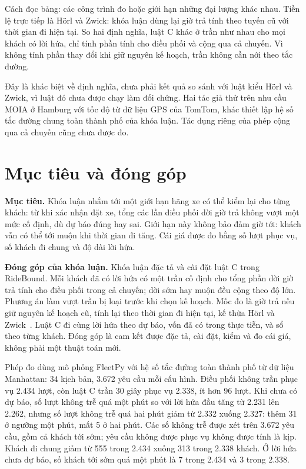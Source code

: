 Cách đọc bảng: các công trình đo hoặc giới hạn những đại lượng khác nhau. Tiền lệ trực tiếp là Hörl và
Zwick: khóa luận dùng lại giờ trả tính theo tuyến cũ với thời gian đi hiện tại. So hai định nghĩa, luật C
khác ở trần như nhau cho mọi khách có lời hứa, chỉ tính phần tính cho điều phối và cộng qua cả chuyến.
Vì không tính phần thay đổi khi giữ nguyên kế hoạch, trần không cần nới theo tắc đường.

Đây là khác biệt về định nghĩa, chưa phải kết quả so sánh với luật kiểu Hörl và Zwick, vì luật đó chưa được
chạy làm đối chứng. Hai tác giả thử trên nhu cầu MOIA ở Hamburg với tốc độ từ dữ liệu GPS của TomTom,
khác thiết lập hệ số tắc đường chung toàn thành phố của khóa luận. Tác dụng riêng của phép cộng qua cả
chuyến cũng chưa được đo.

\section{Mục tiêu và đóng góp}
\label{muc:c1-donggop}

\noindent\textbf{Mục tiêu.} Khóa luận nhắm tới một giới hạn hãng xe có thể kiểm lại cho từng khách: từ khi
xác nhận đặt xe, tổng các lần điều phối dời giờ trả không vượt một mức cố định, dù dự báo đúng hay sai.
Giới hạn này không bảo đảm giờ tới: khách vẫn có thể tới muộn khi thời gian đi tăng. Cái giá được đo bằng
số lượt phục vụ, số khách đi chung và độ dài lời hứa.

\noindent\textbf{Đóng góp của khóa luận.} Khóa luận đặc tả và cài đặt luật C trong RideBound. Mỗi khách đã
có lời hứa có một trần cố định cho tổng phần dời giờ trả tính cho điều phối trong cả chuyến; dời sớm hay
muộn đều cộng theo độ lớn. Phương án làm vượt trần bị loại trước khi chọn kế hoạch. Mốc đo là giờ trả nếu
giữ nguyên kế hoạch cũ, tính lại theo thời gian đi hiện tại, kế thừa Hörl và Zwick~\cite{horl2022}.
Luật C đi cùng lời hứa theo dự báo, vốn đã có trong thực tiễn, và sổ theo từng khách. Đóng góp là cam kết
được đặc tả, cài đặt, kiểm và đo cái giá, không phải một thuật toán mới.

Phép đo dùng mô phỏng FleetPy với hệ số tắc đường toàn thành phố từ dữ liệu Manhattan: 34 kịch bản,
3.672 yêu cầu mỗi cấu hình. Điều phối không trần phục vụ 2.434 lượt, còn luật C trần 30 giây phục vụ
2.338, ít hơn 96 lượt. Khi chưa có dự báo, số lượt không trễ quá một phút so với lời hứa đầu tăng từ
2.231 lên 2.262, nhưng số lượt không trễ quá hai phút giảm từ 2.332 xuống 2.327: thêm 31 ở ngưỡng một
phút, mất 5 ở hai phút. Các số không trễ được xét trên 3.672 yêu cầu, gồm cả khách tới sớm; yêu cầu không
được phục vụ không được tính là kịp. Khách đi chung giảm từ 555 trong 2.434 xuống 313 trong 2.338 khách.
Ở lời hứa chưa dự báo, số khách tới sớm quá một phút là 7 trong 2.434 và 3 trong 2.338.

